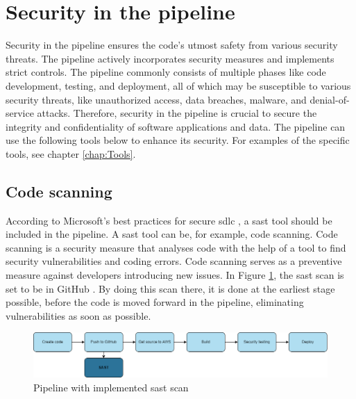\section{Security in the pipeline}
Security in the pipeline ensures the code's utmost safety from various security threats. The \gls{pipeline} actively incorporates security measures and implements strict controls. The pipeline commonly consists of multiple phases like code development, testing, and deployment, all of which may be susceptible to various security threats, like unauthorized access, data breaches, malware, and \gls{denial-of-service} attacks. Therefore, security in the pipeline is crucial to secure the integrity and confidentiality of software applications and data. The \gls{pipeline} can use the following tools below to enhance its security. For examples of the specific tools, see chapter \ref{chap:Tools}. 

\subsection{Code scanning}
\label{Code Scanning}
According to Microsoft's best practices for secure \acrshort{sdlc} \cite{microsoftSDLCpractices}, a \acrshort{sast} tool should be included in the \gls{pipeline}. A \acrshort{sast} tool can be, for example, code scanning. Code scanning is a security measure that analyses code with the help of a tool to find security vulnerabilities and coding errors. Code scanning serves as a preventive measure against developers introducing new issues. In Figure \ref{fig: Pipeline with implemented SAST scan}, the \acrshort{sast} scan is set to be in GitHub \cite{sastplasment}. By doing this scan there, it is done at the earliest stage possible, before the code is moved forward in the pipeline, eliminating vulnerabilities as soon as possible.

 \vspace{2mm}
\begin{figure}[H]
    \centering
    \includegraphics[width=0.8\columnwidth]{Images/pipeline2.png}
    \caption{Pipeline with implemented \acrshort{sast} scan}
    \label{fig: Pipeline with implemented SAST scan}
\end{figure}

